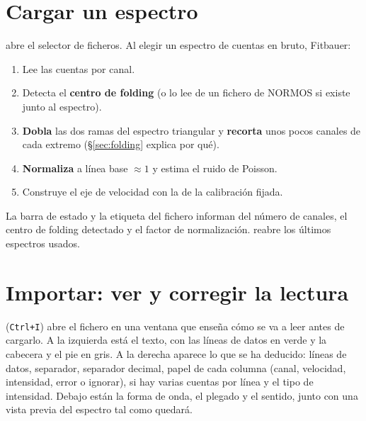 \section{Cargar un espectro}

 abre el selector de ficheros. Al elegir un espectro de
cuentas en bruto, Fitbauer:

\begin{enumerate}[nosep]
  \item Lee las cuentas por canal.
  \item Detecta el \textbf{centro de folding} (o lo lee de un fichero
         de NORMOS si existe junto al espectro).
  \item \textbf{Dobla} las dos ramas del espectro triangular y \textbf{recorta}
        unos pocos canales de cada extremo (§\ref{sec:folding} explica por qué).
  \item \textbf{Normaliza} a línea base $\approx 1$ y estima el ruido de Poisson.
  \item Construye el eje de velocidad con la  de la calibración
        fijada.
\end{enumerate}


\begin{nota}
La barra de estado y la etiqueta del fichero informan del número de canales, el
centro de folding detectado y el factor de normalización.  reabre los últimos espectros usados.
\end{nota}

\section{Importar: ver y corregir la lectura}
\label{sec:importar}

 (\texttt{Ctrl+I}) abre el fichero en una ventana que
enseña cómo se va a leer antes de cargarlo. A la izquierda está el texto, con las
líneas de datos en verde y la cabecera y el pie en gris. A la derecha aparece lo
que se ha deducido: líneas de datos, separador, separador decimal, papel de cada
columna (canal, velocidad, intensidad, error o ignorar), si hay varias cuentas por
línea y el tipo de intensidad. Debajo están la forma de onda, el plegado y el
sentido, junto con una vista previa del espectro tal como quedará.

